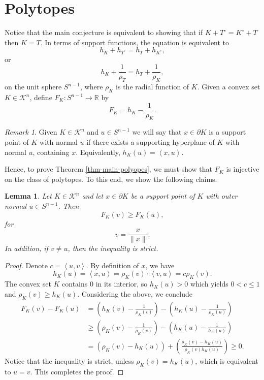 \documentclass[12pt]{article}
\newtheorem{lemma}[theorem]{Lemma}
\theoremstyle{remark}
\newtheorem{remark}[theorem]{Remark}
\newcommand{\R}{\mathbb R}
\newcommand{\Kn}{\mathcal{K}^n}
\newcommand{\ip}[2]{\left\langle #1,#2\right\rangle}
\begin{document}
\section{Polytopes}
Notice that the main conjecture is equivalent to showing that if $K + T^\circ = K^\circ + T$ then $K=T$. In terms of support functions, the equation is equivalent to 
\[
h_K + h_{T^\circ} = h_T + h_{K^\circ},
\]
or 
\begin{equation} \label{eq:support_radial_form}
h_K + \frac{1}{\rho_T} = h_T + \frac{1}{\rho_K},
\end{equation}
on the unit sphere $S^{n-1}$, where $\rho_K$ is the radial function of $K$.
Given a convex set $K \in \Kn$, define $F_K:S^{n-1} \to \R$ by
\[
F_K = h_K - \frac{1}{\rho_K}.
\]
\begin{remark}
Given $K\in \Kn$ and $u\in S^{n-1}$ we will say that $x\in \partial K$ is a support point of $K$ with normal $u$ if there exists a supporting hyperplane of $K$ with normal $u$, containing $x$. Equivalently, $h_K(u) = \ip{x}{u}.$
\end{remark} 
Hence, to prove Theorem \ref{thm-main-polyopes}, we must show that $F_K$ is injective on the class of polytopes. To this end, we show the following claims.


\begin{lemma}\label{lem:ascent}
Let $K\in \Kn$ and let $x\in \partial K$ be a support point of $K$ with outer normal $u\in S^{n-1}$.
Then
\[
        F_K(v)\ge F_K(u),
\]
for \[
        v = \frac{x}{\|x\|}.
\]
In addition, if \(v\ne u\), then the inequality is strict.
\end{lemma}

\begin{proof}
Denote $c=\ip{u}{v}$.
By definition of \(x\), we have
\[
        h_K(u)=\ip{x}{u}=\rho_K(v)\cdot \ip{v}{u}=c\rho_K(v).
\]
The convex set $K$ contains $0$ in its interior, so $h_K(u) > 0$ which yields $0 < c \leq 1$ and $\rho_K(v) \geq h_K(u)$. Considering the above, we conclude
\begin{align*}
        F_K(v)-F_K(u)
        &=\left(h_K(v)-\frac1{\rho_K(v)}\right)
          -\left(h_K(u)-\frac1{\rho_K(u)}\right) \\
        &\ge \left(\rho_K(v)-\frac1{\rho_K(v)}\right)-\left(h_K(u)-\frac1{h_K(u)}\right) \\
        &= \left(\rho_K(v)-h_K(u)\right)+\left(\frac{\rho_K(v)-h_K(u)}{\rho_K(v)h_K(u)}\right) \geq 0.
\end{align*}
Notice that the inequality is strict, unless $\rho_K(v)=h_K(u)$, which is equivalent to $u=v$. This completes the proof.
\end{proof}
\end{document}
